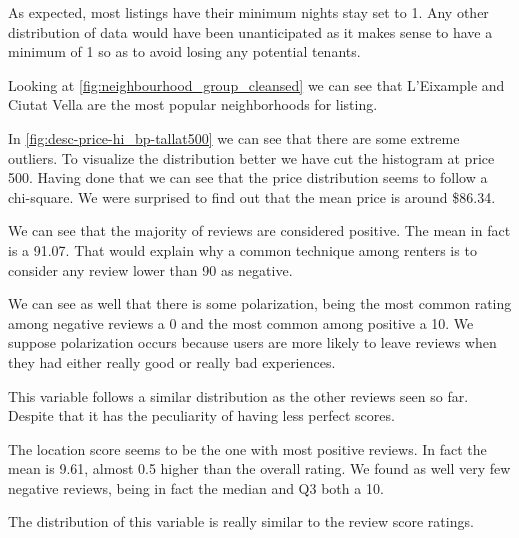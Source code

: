 As expected, most listings have their minimum nights stay set to 1.
Any other distribution of data would have been
unanticipated as it makes sense to have a minimum of 1 so as to avoid
losing any potential tenants.


Looking at \cref{fig:neighbourhood_group_cleansed} we can see that
L'Eixample and Ciutat Vella are the most popular neighborhoods for listing.



In \cref{fig:desc-price-hi_bp-tallat500} we can see that there are some extreme
outliers. To visualize the distribution better we have cut the histogram at
price 500. Having done that we can see that the price distribution seems to
follow a chi-square. We were surprised to find out that the mean price is around
\$86.34.



We can see that the majority of reviews are considered positive. The mean in
fact is a 91.07. That would explain why a common technique among renters is to
consider any review lower than 90 as negative.

We can see as well that there is some polarization, being the most common rating
among negative reviews a 0 and the most common among positive a 10. We suppose
polarization occurs because users are more likely to leave reviews when they had
either really good or really bad experiences.



This variable follows a similar distribution as the other reviews seen so far.
Despite that it has the peculiarity of having less perfect scores.



The location score seems to be the one with most positive reviews. In fact the
mean is 9.61, almost 0.5 higher than the overall rating. We found as well very
few negative reviews, being in fact the median and Q3 both a 10.



The distribution of this variable is really similar to the review score ratings.



